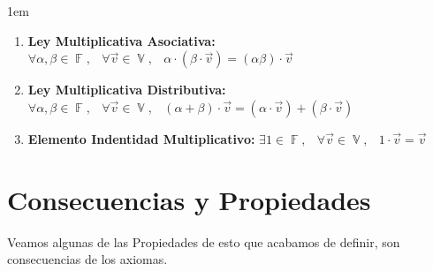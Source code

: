 \documentclass[12pt, fleqn]{report}                             %
\newenvironment{SmallIndentation}[1][0.75em]                    %
        {\begin{adjustwidth}{#1}{}\begin{footnotesize}}             %
        {\end{footnotesize}\end{adjustwidth}}                       %
\DeclareMathOperator \Space     {\quad}                         %
\DeclareMathOperator \MiniSpace {\;}                            %
\theoremstyle{break}                                            %
\DeclareMathOperator \GenericField {\mathbb{F}}                 %
\DeclareMathOperator \VectorSet    {\mathbb{V}}                 %
\begin{document}
\begin{SmallIndentation}[1em]
\begin{enumerate}
                        \item 
                            \textbf{Ley Multiplicativa Asociativa:}
                            $\forall \alpha, \beta \in \GenericField, \MiniSpace
                                \forall \vec{v} \in \VectorSet, \MiniSpace
                                    \alpha \cdot (\beta \cdot \vec{v}) = (\alpha \beta) \cdot \vec{v}$

                        \item 
                            \textbf{Ley Multiplicativa Distributiva:}
                            $\forall \alpha, \beta \in \GenericField, \MiniSpace
                                \forall \vec{v} \in \VectorSet, \MiniSpace
                                    (\alpha + \beta) \cdot \vec{v} = 
                                            (\alpha \cdot \vec{v}) + (\beta \cdot \vec{v})$

                        \item 
                            \textbf{Elemento Indentidad Multiplicativo:}
                            $\exists 1 \in \GenericField, \MiniSpace
                                \forall \vec{v} \in \VectorSet, \MiniSpace 1 \cdot \vec{v} = \vec{v}$

                    \end{enumerate}

                \end{SmallIndentation}




        \clearpage
        \section{Consecuencias y Propiedades}

            Veamos algunas de las Propiedades de esto que acabamos de definir, son consecuencias de los 
            axiomas.
\end{document}
